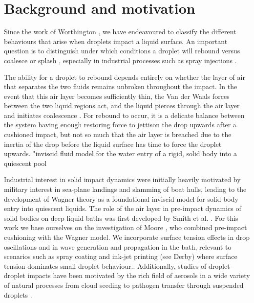 \section{Background and motivation}\label{sect:Introduction}


Since the work of Worthington \cite{worthington1881impact, worthington1883impact}, we have endeavoured to classify the different behaviours that arise when droplets impact a liquid surface. An important question is to distinguish under which conditions a droplet will rebound versus coalesce or splash \cite{rein1993phenomena}, especially in industrial processes such as spray injections \cite{moreira2010advances}.

The ability for a droplet to rebound depends entirely on whether the layer of air that separates the two fluids remains unbroken throughout the impact. In the event that this air layer becomes sufficiently thin, the Van der Waals forces between the two liquid regions act, and the liquid pierces through the air layer and initiates coalescence \cite{sprittles2024gas}. For rebound to occur, it is a delicate balance between the system having enough restoring force to jettison the drop upwards after a cushioned impact, but not so much that the air layer is breached due to the inertia of the drop before the liquid surface has time to force the droplet upwards. 
"inviscid fluid model for the water entry of a rigid, solid body into a quiescent pool

Industrial interest in solid impact dynamics were initially heavily motivated by military interest in sea-plane landings and slamming of boat hulls, leading to the development of Wagner theory \cite{wagner1932phenomena, korobkin2004analytical} as a foundational inviscid model for solid body entry into quiescent liquids. The role of the air layer in pre-impact dynamics of solid bodies on deep liquid baths was first developed by Smith et al. \cite{smith2003air}. For this work we base ourselves on the investigation of Moore \cite{moore2021introducing}, who combined pre-impact cushioning with the Wagner model. We incorporate surface tension effects in drop oscillations and in wave generation and propagation in the bath, relevant to scenarios such as spray coating and ink-jet printing (see Derby\cite{derby2010inkjet}) where surface tension dominates small droplet behaviour.. Additionally, studies of droplet-droplet impacts have been motivated by the rich field of aerosols in a wide variety of natural processes from cloud seeding \cite{bird2010daughter} to pathogen transfer through suspended droplets \cite{yang2007size}.



